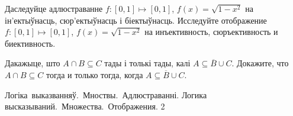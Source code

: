\documentclass[12pt, a4paper]{article}
\begin{document}
\begin{problemList}
\bigskip

\problemItemSimple
{Даследуйце адлюстраванне $f: [0, 1] \mapsto [0, 1]$, $f(x) = \sqrt{1 - x^2}$ на ін'ектыўнасць, сюр'ектыўнасць і біектыўнасць.}
{Исследуйте отображение $f: [0, 1] \mapsto [0, 1]$, $f(x) = \sqrt{1 - x^2}$ на инъективность, сюръективность и биективность.}

\bigskip

\problemItemSimple
{Дакажыце, што $A \cap B \subseteq C$ тады і толькі тады, калі $A \subseteq \overline{B} \cup C$.}
{Докажите, что $A \cap B \subseteq C$ тогда и только тогда, когда $A \subseteq \overline{B} \cup C$.}

\end{problemList}

\newpage

\quizTitle
{Логіка~выказванняў.~Мноствы.~Адлюстраванні.}
{Логика высказываний.~Множества.~Отображения.}
{2}
\end{document}
